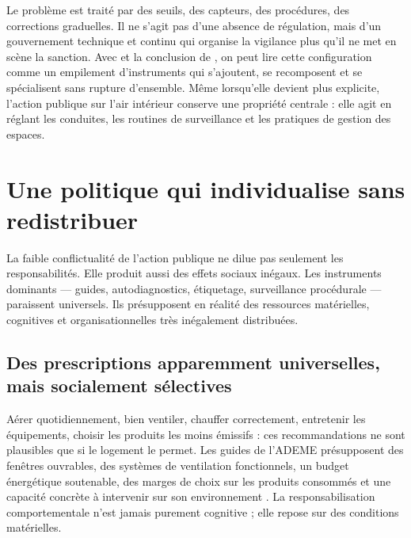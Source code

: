 \documentclass[a4paper,12pt,twoside]{book}
\begin{document}
Le problème est traité par des seuils, des capteurs, des procédures, des corrections graduelles. Il ne s'agit pas d'une absence de régulation, mais d'un gouvernement technique et continu qui organise la vigilance plus qu'il ne met en scène la sanction. Avec \textcite{palierChapitre7Instruments2005} et la conclusion de \textcite{lascoumesConclusionLinnovationInstrumentale2005}, on peut lire cette configuration comme un empilement d'instruments qui s'ajoutent, se recomposent et se spécialisent sans rupture d'ensemble. Même lorsqu'elle devient plus explicite, l'action publique sur l'air intérieur conserve une propriété centrale : elle agit en réglant les conduites, les routines de surveillance et les pratiques de gestion des espaces.

\chapter{Une politique qui individualise sans redistribuer}

La faible conflictualité de l'action publique ne dilue pas seulement les responsabilités. Elle produit aussi des effets sociaux inégaux. Les instruments dominants --- guides, autodiagnostics, étiquetage, surveillance procédurale --- paraissent universels. Ils présupposent en réalité des ressources matérielles, cognitives et organisationnelles très inégalement distribuées.

\section[Des prescriptions universelles en apparence]{Des prescriptions apparemment universelles, mais socialement sélectives}

Aérer quotidiennement, bien ventiler, chauffer correctement, entretenir les équipements, choisir les produits les moins émissifs : ces recommandations ne sont plausibles que si le logement le permet. Les guides de l'ADEME présupposent des fenêtres ouvrables, des systèmes de ventilation fonctionnels, un budget énergétique soutenable, des marges de choix sur les produits consommés et une capacité concrète à intervenir sur son environnement \parencite{ADEME2024AirSainChezSoi,ADEME2023BienVentiler}. La responsabilisation comportementale n'est jamais purement cognitive ; elle repose sur des conditions matérielles.
\end{document}
